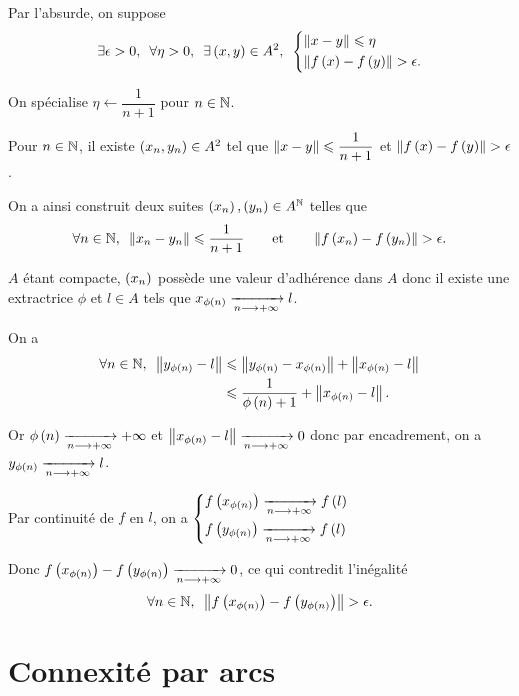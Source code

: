 \begin{dem}
Par l'absurde, on suppose \[\quantifs{\exists\epsilon>0;\forall\eta>0;\exists\paren{x,y}\in A^2}\begin{dcases}
\norme{x-y}\leq\eta \\
\norme{f\paren{x}-f\paren{y}}>\epsilon.
\end{dcases}\]

On spécialise \(\eta\gets\dfrac{1}{n+1}\) pour \(n\in\mathbb{N}\).

Pour \(n\in\mathbb{N}\), il existe \(\left(x_n,y_n\right)\in A^2\) tel que \(\norme{x-y}\leq\dfrac{1}{n+1}\) et \(\norme{f\paren{x}-f\paren{y}}>\epsilon\).

On a ainsi construit deux suites \(\left(x_n\right),\left(y_n\right)\in A^{\mathbb{N}}\) telles que \[\quantifs{\forall n\in\N}\norme{x_n-y_n}\leq\dfrac{1}{n+1}\qquad\text{et}\qquad\norme{f\paren{x_n}-f\paren{y_n}}>\epsilon.\]

\(A\) étant compacte, \(\left(x_n\right)\) possède une valeur d'adhérence dans \(A\) donc il existe une extractrice \(\phi\) et \(l\in A\) tels que \(x_{\phi\left(n\right)}\xrightarrow[n\longrightarrow+\infty]{}l\).

On a \[\begin{aligned}
\quantifs{\forall n\in\N}\norme{y_{\phi\paren{n}}-l}&\leq\norme{y_{\phi\paren{n}}-x_{\phi\paren{n}}}+\norme{x_{\phi\paren{n}}-l} \\
&\leq\dfrac{1}{\phi\paren{n}+1}+\norme{x_{\phi\paren{n}}-l}.
\end{aligned}\]

Or \(\phi\left(n\right)\xrightarrow[n\longrightarrow+\infty]{}+\infty\) et \(\norme{x_{\phi\paren{n}}-l}\tendqd{n\to\pinf}0\) donc par encadrement, on a \(y_{\phi\left(n\right)}\xrightarrow[n\longrightarrow+\infty]{}l\).

Par continuité de \(f\) en \(l\), on a \(\begin{dcases}
f\left(x_{\phi\left(n\right)}\right)\xrightarrow[n\longrightarrow+\infty]{}f\left(l\right) \\
f\left(y_{\phi\left(n\right)}\right)\xrightarrow[n\longrightarrow+\infty]{}f\left(l\right)
\end{dcases}\)

Donc \(f\left(x_{\phi\left(n\right)}\right)-f\left(y_{\phi\left(n\right)}\right)\xrightarrow[n\longrightarrow+\infty]{}0\), ce qui contredit l'inégalité \[\quantifs{\forall n\in\N}\norme{f\paren{x_{\phi\paren{n}}}-f\paren{y_{\phi\paren{n}}}}>\epsilon.\]
\end{dem}

\section{Connexité par arcs}

